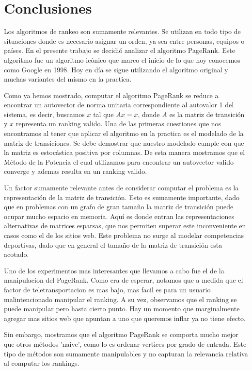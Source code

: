 \section{Conclusiones}

Los algoritmos de rankeo son sumamente relevantes. Se utilizan en todo tipo de situaciones donde es necesario asignar un orden, ya sea entre personas, equipos o países. En el presente trabajo se decidió analizar el algoritmo PageRank. Este algoritmo fue un algoritmo icónico que marco el inicio de lo que hoy conocemos como Google en 1998. Hoy en día se sigue utilizando el algoritmo original y muchas variantes del mismo en la practica.

Como ya hemos mostrado, computar el algoritmo PageRank se reduce a encontrar un autovector de norma unitaria correspondiente al autovalor 1 del sistema, es decir, buscamos $x$ tal que $Ax = x$, donde $A$ es la matriz de transición y $x$ representa un ranking valido. Una de las primeras cuestiones que nos encontramos al tener que aplicar el algoritmo en la practica es el modelado de la matriz de transiciones. Se debe demostrar que nuestro modelado cumple con que la matriz es estocástica positiva por columnas. De esta manera mostramos que el Método de la Potencia el cual utilizamos para encontrar un autovector valido converge y ademas resulta en un ranking valido.

Un factor sumamente relevante antes de considerar computar el problema es la representación de la matriz de transición. Esto es sumamente importante, dado que en problemas con un grafo de gran tamaño la matriz de transición puede ocupar mucho espacio en memoria. Aquí es donde entran las representaciones alternativas de matrices esparsas, que nos permiten superar este inconveniente en casos como el de los sitios web. Este problema no surge al modelar competencias deportivas, dado que en general el tamaño de la matriz de transición esta acotado. 

Uno de los experimentos mas interesantes que llevamos a cabo fue el de la manipulacion del PageRank. Como era de esperar, notamos que a medida que el factor de teletransportacion es mas bajo, mas facil es para un usuario malintencionado manipular el ranking. A su vez, observamos que el ranking se puede manipular pero hasta cierto punto. Hay un momento que marginalmente agregar mas sitios web que apuntan a uno que queremos inflar ya no tiene efecto.

Sin embargo, mostramos que el algoritmo PageRank se comporta mucho mejor que otros métodos 'naive', como lo es ordenar vertices por grado de entrada. Este tipo de métodos son sumamente manipulables y no capturan la relevancia relativa al computar los rankings.

